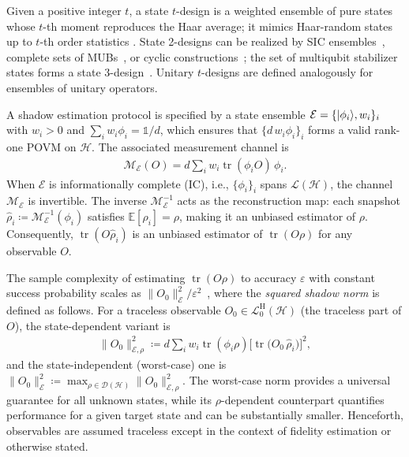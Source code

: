 \documentclass[aps,pra,twocolumn,nofootinbib,superscriptaddress,10pt]{revtex4-2}
\DeclarePairedDelimiter{\ket}{\lvert}{\rangle}
\DeclareMathOperator{\tr}{tr}
\newcommand{\bbE}{\mathbb{E}}
\newcommand{\bbone}{\mathds{1}}
\newcommand{\caD}{\mathcal{D}}
\newcommand{\caE}{\mathcal{E}}
\newcommand{\caH}{\mathcal{H}}
\newcommand{\caL}{\mathcal{L}}
\newcommand{\caM}{\mathcal{M}}
\newcommand{\rmH}{\mathrm{H}}
\begin{document}
Given a positive integer $t$, a state $t$-design is a weighted ensemble of pure states whose $t$-th moment reproduces the Haar average; it mimics Haar-random states up to $t$-th order statistics \cite{Zauner11,Renes04,Scott06,Ambainis07}. State 2-designs can be realized by SIC ensembles~\cite{Zauner11,Renes04,Fuchs17}, 
complete sets of MUBs~\cite{DURT10,Wootters89,Ivanovic81}, or cyclic constructions~\cite{Gonzalez25}; 
the set of multiqubit stabilizer states forms a state 
3-design~\cite{Kueng15,Zhu17,Webb16}. Unitary $t$-designs are defined analogously for ensembles of unitary operators.

A shadow estimation protocol is specified by a state ensemble $\caE=\{\ket{\phi_i},w_i\}_i$ with $w_i>0$ and ${\sum_i w_i \phi_i=\bbone/d}$, which ensures that $\{d\,w_i\phi_i\}_i$ forms a valid rank-one POVM on $\caH$. The associated measurement channel is
\begin{align}\label{eq:MeasCh}
	\caM_\caE(O) = d\sum_i w_i \tr(\phi_i O)\,\phi_i.
\end{align}
When $\caE$ is informationally complete (IC), i.e.,  $\{\phi_i\}_i$ spans $\caL(\caH)$, the channel $\caM_\caE$ is invertible. The inverse $\caM_\caE^{-1}$ acts as the reconstruction map: each snapshot $\hat{\rho}_i \coloneqq \caM_\caE^{-1}(\phi_i)$ satisfies $\bbE[\hat{\rho}_i] = \rho$, making it an unbiased estimator of $\rho$. Consequently, $\tr(O \hat{\rho}_i)$ is an unbiased estimator of $\tr(O\rho)$ for any observable $O$. 

The sample complexity of estimating $\tr(O\rho)$ to accuracy $\varepsilon$ with constant success probability scales as $\|O_0\|_\caE^2/\varepsilon^2$~\cite{HuangKP20}, where the \emph{squared shadow norm} is defined as follows. For a traceless observable $O_0\in\caL^{\rmH}_0(\caH)$ (the traceless part of $O$), the state-dependent variant is
\begin{align}\label{eq:normSD}
\|O_0\|_{\caE,\rho}^2 \coloneqq d\sum_i w_i \tr(\phi_i\rho)\bigl[\tr\bigl(O_0\,\hat{\rho}_i\bigr)\bigr]^2,
\end{align}
and the state-independent (worst-case) one is $\|O_0\|_\caE^2 \coloneqq \max_{\rho\in\caD(\caH)} \|O_0\|_{\caE,\rho}^2$. The worst-case norm provides a universal guarantee for all unknown states, while its $\rho$-dependent counterpart quantifies performance for a given target state and can be substantially smaller. Henceforth, observables are assumed traceless except in the context of fidelity estimation or otherwise stated.
\end{document}
